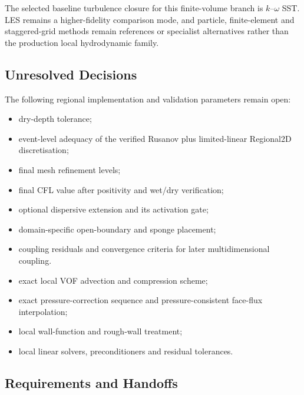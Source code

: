 The selected baseline turbulence closure for this finite-volume branch
is $k$--$\omega$ SST. LES remains a higher-fidelity comparison mode,
and particle, finite-element and staggered-grid methods remain
references or specialist alternatives rather than the production local
hydrodynamic family.

\subsection{Unresolved Decisions}
\label{sec:res-num-frm-unresolved-decisions}


The following regional implementation and validation parameters remain
open:

\begin{itemize}
  \item dry-depth tolerance;
  \item event-level adequacy of the verified Rusanov plus
    limited-linear Regional2D discretisation;
  \item final mesh refinement levels;
  \item final CFL value after positivity and wet/dry verification;
  \item optional dispersive extension and its activation gate;
  \item domain-specific open-boundary and sponge placement;
  \item coupling residuals and convergence criteria for later
    multidimensional coupling.
  \item exact local VOF advection and compression scheme;
  \item exact pressure-correction sequence and pressure-consistent
    face-flux interpolation;
  \item local wall-function and rough-wall treatment;
  \item local linear solvers, preconditioners and residual tolerances.
\end{itemize}

\subsection{Requirements and Handoffs}
\label{sec:res-num-frm-requirements}


